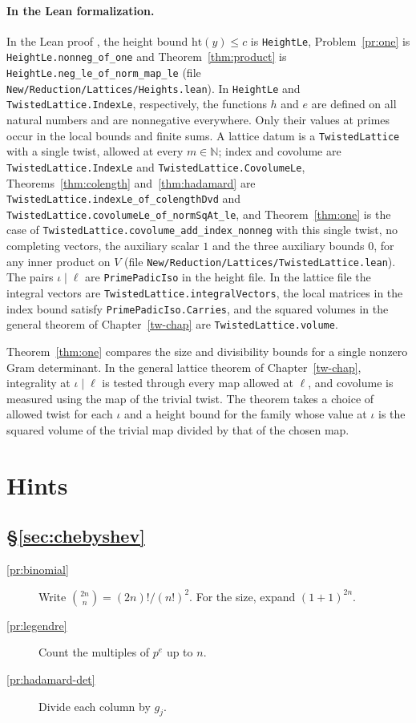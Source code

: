 \documentclass[reqno]{amsart}
\newcounter{chap}
\theoremstyle{definition}
\theoremstyle{plain}
\begin{document}
\paragraph{In the Lean formalization.}  In the Lean proof \cite{GL}, the height bound \(\mathrm{ht}(y) \le c\) is \texttt{HeightLe}, Problem~\ref{pr:one} is \texttt{HeightLe.nonneg\_of\_one} and Theorem~\ref{thm:product} is \texttt{HeightLe.neg\_le\_of\_norm\_map\_le} (file \texttt{New/Reduction/Lattices/Heights.lean}).  In \texttt{HeightLe} and \texttt{TwistedLattice.IndexLe}, respectively, the functions \(h\) and \(e\) are defined on all natural numbers and are nonnegative everywhere.  Only their values at primes occur in the local bounds and finite sums.  A lattice datum is a \texttt{TwistedLattice} with a single twist, allowed at every \(m \in \mathbb{N}\); index and covolume are \texttt{TwistedLattice.IndexLe} and \texttt{TwistedLattice.CovolumeLe}, Theorems~\ref{thm:colength} and~\ref{thm:hadamard} are \texttt{TwistedLattice.indexLe\_of\_colengthDvd} and \texttt{TwistedLattice.covolumeLe\_of\_normSqAt\_le}, and Theorem~\ref{thm:one} is the case of \texttt{TwistedLattice.covolume\_add\_index\_nonneg} with this single twist, no completing vectors, the auxiliary scalar \(1\) and the three auxiliary bounds \(0\), for any inner product on \(V\) (file \texttt{New/Reduction/Lattices/TwistedLattice.lean}).  The pairs \(\iota \mid \ell\) are \texttt{PrimePadicIso} in the height file.  In the lattice file the integral vectors are \texttt{TwistedLattice.integralVectors}, the local matrices in the index bound satisfy \texttt{PrimePadicIso.Carries}, and the squared volumes in the general theorem of Chapter~\ref{tw-chap} are \texttt{TwistedLattice.volume}.

Theorem~\ref{thm:one} compares the size and divisibility bounds for a single nonzero Gram determinant.  In the general lattice theorem of Chapter~\ref{tw-chap}, integrality at \(\iota \mid \ell\) is tested through every map allowed at \(\ell\), and covolume is measured using the map of the trivial twist.  The theorem takes a choice of allowed twist for each \(\iota\) and a height bound for the family whose value at \(\iota\) is the squared volume of the trivial map divided by that of the chosen map.

\section*{Hints}

\subsection*{\S\ref{sec:chebyshev}}
\begin{description}
\item[\ref{pr:binomial}] Write \(\binom{2n}{n} = (2n)!/(n!)^2\).  For the size, expand \((1+1)^{2n}\).
\item[\ref{pr:legendre}] Count the multiples of \(p^e\) up to \(n\).
\item[\ref{pr:hadamard-det}] Divide each column by \(g_j\).
\end{description}
\end{document}
